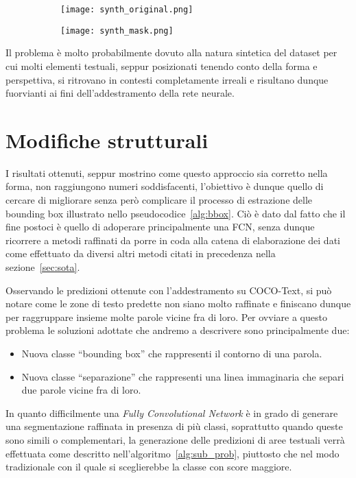 \begin{figure}[H]
	\centering
	\begin{subfigure}[b]{0.49\textwidth}
		\texttt{[image: synth\_original.png]}
	\end{subfigure}
	\hfill
	\begin{subfigure}[b]{0.49\textwidth}
		\texttt{[image: synth\_mask.png]}
	\end{subfigure}
\caption{}
\label{fig:synth_example}
\end{figure}

Il problema è molto probabilmente dovuto alla natura sintetica del dataset per cui molti elementi testuali, seppur posizionati tenendo conto della forma e perspettiva, si ritrovano in contesti completamente irreali e risultano dunque fuorvianti ai fini dell'addestramento della rete neurale.



\section{Modifiche strutturali}

I risultati ottenuti, seppur mostrino come questo approccio sia corretto nella forma, non raggiungono numeri soddisfacenti, l'obiettivo è dunque quello di cercare di migliorare senza però complicare il processo di estrazione delle bounding box illustrato nello pseudocodice~\ref{alg:bbox}. Ciò è dato dal fatto che il fine postoci è quello di adoperare principalmente una FCN, senza dunque ricorrere a metodi raffinati da porre in coda alla catena di elaborazione dei dati come effettuato da diversi altri metodi citati in precedenza nella sezione~\ref{sec:sota}.\par
Osservando le predizioni ottenute con l'addestramento su COCO-Text, si può notare come le zone di testo predette non siano molto raffinate e finiscano dunque per raggruppare insieme molte parole vicine fra di loro. Per ovviare a questo problema le soluzioni adottate che andremo a descrivere sono principalmente due:
\begin{itemize}
	\item
		Nuova classe ``bounding box'' che rappresenti il contorno di una parola.
	\item
		Nuova classe ``separazione'' che rappresenti una linea immaginaria che separi due parole vicine fra di loro.
\end{itemize}

In quanto difficilmente una \textit{Fully Convolutional Network} è in grado di generare una segmentazione raffinata in presenza di più classi, soprattutto quando queste sono simili o complementari, la generazione delle predizioni di aree testuali verrà effettuata come descritto nell'algoritmo~\ref{alg:sub_prob}, piuttosto che nel modo tradizionale con il quale si sceglierebbe la classe con score maggiore.

